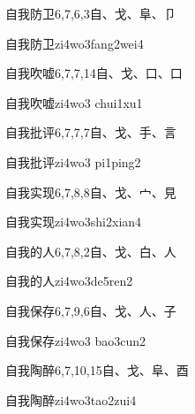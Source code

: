 \begin{Entry}{自我防卫}{6,7,6,3}{⾃、⼽、⾩、⼙}
  \begin{Phonetics}{自我防卫}{zi4wo3fang2wei4}
  \end{Phonetics}
\end{Entry}

\begin{Entry}{自我吹嘘}{6,7,7,14}{⾃、⼽、⼝、⼝}
  \begin{Phonetics}{自我吹嘘}{zi4wo3 chui1xu1}
  \end{Phonetics}
\end{Entry}

\begin{Entry}{自我批评}{6,7,7,7}{⾃、⼽、⼿、⾔}
  \begin{Phonetics}{自我批评}{zi4wo3 pi1ping2}
  \end{Phonetics}
\end{Entry}

\begin{Entry}{自我实现}{6,7,8,8}{⾃、⼽、⼧、⾒}
  \begin{Phonetics}{自我实现}{zi4wo3shi2xian4}
  \end{Phonetics}
\end{Entry}

\begin{Entry}{自我的人}{6,7,8,2}{⾃、⼽、⽩、⼈}
  \begin{Phonetics}{自我的人}{zi4wo3de5ren2}
  \end{Phonetics}
\end{Entry}

\begin{Entry}{自我保存}{6,7,9,6}{⾃、⼽、⼈、⼦}
  \begin{Phonetics}{自我保存}{zi4wo3 bao3cun2}
  \end{Phonetics}
\end{Entry}

\begin{Entry}{自我陶醉}{6,7,10,15}{⾃、⼽、⾩、⾣}
  \begin{Phonetics}{自我陶醉}{zi4wo3tao2zui4}
  \end{Phonetics}
\end{Entry}

